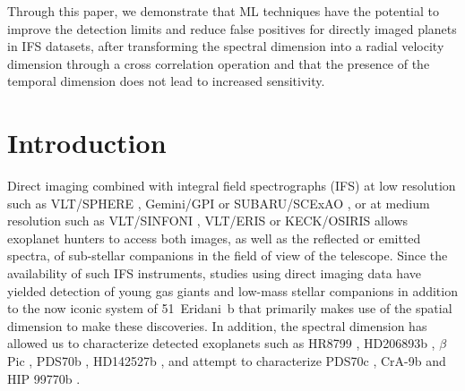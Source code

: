 \documentclass{aa}
\begin{document}
  {Through this paper, we demonstrate that ML techniques have the potential to improve the detection limits and reduce false positives for directly imaged planets in IFS datasets, after transforming the spectral dimension into a radial velocity dimension through a cross correlation operation and that the presence of the temporal dimension does not lead to increased sensitivity.
  }
   

\maketitle
%

\section{Introduction}

Direct imaging combined with integral field spectrographs (IFS) at low resolution such as VLT/SPHERE \citep{2019Beuzit}, Gemini/GPI \citep{2014MacintoshGPI} or SUBARU/SCExAO \citep{2015SCeXAO}, or at medium resolution such as VLT/SINFONI \citep{2004SINFONI}, VLT/ERIS \citep{2023Davies} or KECK/OSIRIS \citep{2000OSIRIS} allows exoplanet hunters to access both images, as well as the reflected or emitted spectra, of sub-stellar companions in the field of view of the telescope.
Since the availability of such IFS instruments, studies using direct imaging data have yielded detection of young gas giants \citep[e.g., PDS70b, ][]{2018KepplerPDS70} and low-mass stellar companions \citep[e.g., HD142527b, ][]{2019ClaudiHD142527b} in addition to the now iconic system of 51~Eridani~b \citep{2015MacintoshEridani} that primarily makes use of the spatial dimension to make these discoveries.
In addition, the spectral dimension has allowed us to characterize detected exoplanets such as HR8799 \citep[e.g][]{2008Marois, 2013Konopacky}, HD206893b \citep[][]{2017DelormeHD206893b}, $\beta$ Pic \citep[][]{2017ChilcoteBetapic}, PDS70b \citep[e.g][]{2018MullerPDS70,2019ChristiaensPDS70}, HD142527b \citep[][]{2018A&ChristiaensHD142527}, and attempt to characterize PDS70c \citep[][]{2019MesaPDS70}, CrA-9b \citep[][]{2021ChristiaensCrA-9b} and HIP 99770b \citep[][]{2023Currie}.
\end{document}
